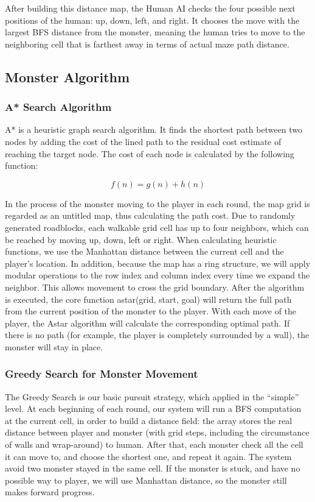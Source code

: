 \documentclass[12pt,a4paper]{article}
\begin{document}
After building this distance map, 
the Human AI checks the four possible next positions of the human: 
up, down, left, and right. 
It chooses the move with the largest BFS distance from the monster, 
meaning the human tries to move to the neighboring cell 
that is farthest away in terms of actual maze path distance.

\subsection{Monster Algorithm}

\subsubsection{A* Search Algorithm}

A* is a heuristic graph search algorithm. It finds the shortest path between two nodes by adding the cost of the lined path to the residual cost estimate of reaching the target node. The cost of each node is calculated by the following function:

\[
f(n) = g(n) + h(n)
\]

In the process of the monster moving to the player in each round, the map grid is regarded as an untitled map, thus calculating the path cost. Due to randomly generated roadblocks, each walkable grid cell has up to four neighbors, which can be reached by moving up, down, left or right. When calculating heuristic functions, we use the Manhattan distance between the current cell and the player's location. In addition, because the map has a ring structure, we will apply modular operations to the row index and column index every time we expand the neighbor. This allows movement to cross the grid boundary. After the algorithm is executed, the core function astar(grid, start, goal) will return the full path from the current position of the monster to the player. With each move of the player, the Astar algorithm will calculate the corresponding optimal path. If there is no path (for example, the player is completely surrounded by a wall), the monster will stay in place.


\subsubsection{Greedy Search for Monster Movement}

The Greedy Search is our basic pursuit strategy, which applied in the ``simple'' level. At each beginning of each round, our system will run a BFS computation at the current cell, in order to build a distance field: the array stores the real distance between player and monster (with grid steps, including the circumstance of walls and wrap-around) to human. After that, each monster check all the cell it can move to, and choose the shortest one, and repeat it again. The system avoid two monster stayed in the same cell. If the monster is stuck, and have no possible way to player, we will use Manhattan distance, so the monster still makes forward progress.
\end{document}
